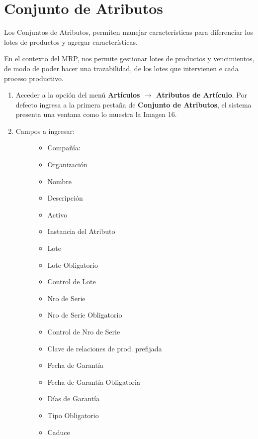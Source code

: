 \documentclass[letterpaper,10pt,spanish]{sphinxmanual}
\begin{document}
\section{Conjunto de Atributos}
\label{maestros:conjunto-de-atributos}
Los Conjuntos de Atributos, permiten manejar características para diferenciar los lotes de productos y agregar características.

En el contexto del MRP, nos permite gestionar lotes de productos y vencimientos, de modo de poder hacer una trazabilidad, de los lotes que intervienen e cada proceso productivo.
\begin{enumerate}
\item {} 
Acceder a la opción del menú \textbf{Artículos \(\rightarrow\)  Atributos de Artículo}. Por defecto ingresa a la primera pestaña de \textbf{Conjunto de Atributos}, el sistema presenta una ventana como lo muestra la Imagen 16.

\item {} \begin{description}
\item[{Campos a ingresar:}] \leavevmode\begin{itemize}
\item {} 
Compañía:

\item {} 
Organización

\item {} 
Nombre

\item {} 
Descripción

\item {} 
Activo

\item {} 
Instancia del Atributo

\item {} 
Lote

\item {} 
Lote Obligatorio

\item {} 
Control de Lote

\item {} 
Nro de Serie

\item {} 
Nro de Serie Obligatorio

\item {} 
Control de Nro de Serie

\item {} 
Clave de relaciones de prod. prefijada

\item {} 
Fecha de Garantía

\item {} 
Fecha de Garantía Obligatoria

\item {} 
Días de Garantía

\item {} 
Tipo Obligatorio

\item {} 
Caduce

\end{itemize}

\end{description}

\end{enumerate}
\end{document}
